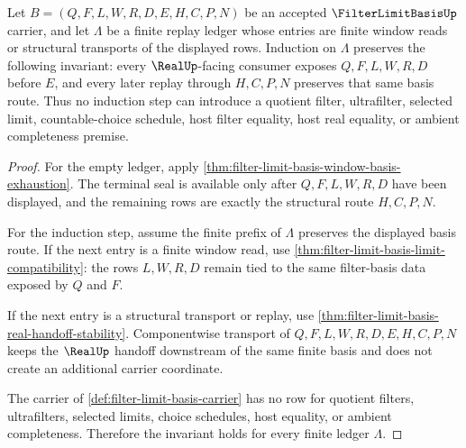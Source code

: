 \begin{theorem}
\label{thm:filter-limit-basis-window-induction}
Let $B=(Q,F,L,W,R,D,E,H,C,P,N)$ be an accepted $\FilterLimitBasisUp$ carrier, and let $\Lambda$ be a finite replay ledger whose entries are finite window reads or structural transports of the displayed rows. Induction on $\Lambda$ preserves the following invariant: every $\RealUp$-facing consumer exposes $Q,F,L,W,R,D$ before $E$, and every later replay through $H,C,P,N$ preserves that same basis route. Thus no induction step can introduce a quotient filter, ultrafilter, selected limit, countable-choice schedule, host filter equality, host real equality, or ambient completeness premise.
\end{theorem}
\begin{proof}
For the empty ledger, apply \autoref{thm:filter-limit-basis-window-basis-exhaustion}. The terminal seal is available only after $Q,F,L,W,R,D$ have been displayed, and the remaining rows are exactly the structural route $H,C,P,N$.

For the induction step, assume the finite prefix of $\Lambda$ preserves the displayed basis route. If the next entry is a finite window read, use \autoref{thm:filter-limit-basis-limit-compatibility}: the rows $L,W,R,D$ remain tied to the same filter-basis data exposed by $Q$ and $F$.

If the next entry is a structural transport or replay, use \autoref{thm:filter-limit-basis-real-handoff-stability}. Componentwise transport of $Q,F,L,W,R,D,E,H,C,P,N$ keeps the $\RealUp$ handoff downstream of the same finite basis and does not create an additional carrier coordinate.

The carrier of \autoref{def:filter-limit-basis-carrier} has no row for quotient filters, ultrafilters, selected limits, choice schedules, host equality, or ambient completeness. Therefore the invariant holds for every finite ledger $\Lambda$.
\end{proof}

